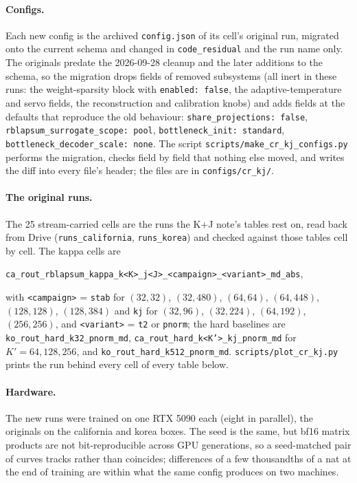 \documentclass[11pt,a4paper]{article}
\newcommand{\code}[1]{\texttt{#1}}
\newcommand{\Kp}{K'}
\begin{document}
\paragraph{Configs.}
Each new config is the archived \code{config.json} of its cell's original
run, migrated onto the current schema and changed in \code{code\_residual}
and the run name only. The originals predate the 2026-09-28 cleanup and the
later additions to the schema, so the migration drops fields of removed
subsystems (all inert in these runs: the weight-sparsity block with
\code{enabled: false}, the adaptive-temperature and servo fields, the
reconstruction and calibration knobs) and adds fields at the defaults that
reproduce the old behaviour: \code{share\_projections: false},
\code{rblapsum\_surrogate\_scope: pool}, \code{bottleneck\_init: standard},
\code{bottleneck\_decoder\_scale: none}. The script
\code{scripts/make\_cr\_kj\_configs.py} performs the migration, checks field
by field that nothing else moved, and writes the diff into every file's
header; the files are in \code{configs/cr\_kj/}.

\paragraph{The original runs.}
The 25 stream-carried cells are the runs the K+J note's tables rest on, read
back from Drive (\code{runs\_california}, \code{runs\_korea}) and checked
against those tables cell by cell. The kappa cells are
\begin{center}\small
\code{ca\_rout\_rblapsum\_kappa\_k<K>\_j<J>\_<campaign>\_<variant>\_md\_abs},
\end{center}
with \code{<campaign>} = \code{stab} for $(32,32)$, $(32,480)$, $(64,64)$,
$(64,448)$, $(128,128)$, $(128,384)$ and \code{kj} for $(32,96)$, $(32,224)$,
$(64,192)$, $(256,256)$, and \code{<variant>} = \code{t2} or \code{pnorm};
the hard baselines are \code{ko\_rout\_hard\_k32\_pnorm\_md},
\code{ca\_rout\_hard\_k<K'>\_kj\_pnorm\_md} for $\Kp = 64, 128, 256$, and
\code{ko\_rout\_hard\_k512\_pnorm\_md}. \code{scripts/plot\_cr\_kj.py} prints
the run behind every cell of every table below.

\paragraph{Hardware.}
The new runs were trained on one RTX 5090 each (eight in parallel), the
originals on the california and korea boxes. The seed is the same, but bf16
matrix products are not bit-reproducible across GPU generations, so a
seed-matched pair of curves tracks rather than coincides; differences of a
few thousandths of a nat at the end of training are within what the same
config produces on two machines.
\end{document}
